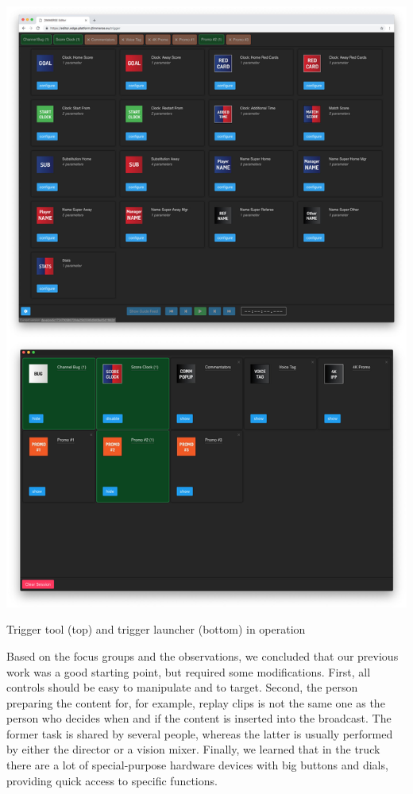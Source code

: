 \documentclass[sigchi-a, authorversion]{acmart}
\begin{document}
\begin{marginfigure}
    \includegraphics[width=\marginparwidth-10pt]{Figures/triggertool.jpg}
    \caption{Trigger tool (top) and trigger launcher (bottom) in operation}
    \label{fig:triggertool}
\end{marginfigure}

Based on the focus groups and the observations, we concluded that our previous
work was a good starting point, but required some modifications. First, all
controls should be easy to manipulate and to target. Second, the person
preparing the content for, for example, replay clips is not the same one as the
person who decides when and if the content is inserted into the broadcast. The
former task is shared by several people, whereas the latter is usually performed
by either the director or a vision mixer. Finally, we learned that in the truck
there are a lot of special-purpose hardware devices with big buttons and dials,
providing quick access to specific functions.
\end{document}
